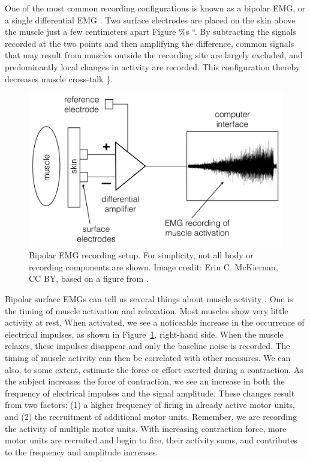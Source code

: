 \documentclass{article}
\begin{document}
One of the most common recording configurations is known as a bipolar EMG, or a single differential EMG \citep{garcia2011surface}. Two surface electrodes are placed on the skin above the muscle just a few centimeters apart \citep{}Figure \%s ``. By subtracting the signals recorded at the two points and then amplifying the difference, common signals that may result from muscles outside the recording site are largely excluded, and predominantly local changes in activity are recorded. This configuration thereby decreases muscle cross-talk \citep{garcia2011surface}\}.

\begin{figure}[!htbp]
\centering
\includegraphics[width=0.8\linewidth]{files/EPpXta8zJdzN048lz8AR-25e73ea3348af927126271020a0558ad.png}
\caption[]{Bipolar EMG recording setup. For simplicity, not all body or recording components are shown. Image credit: Erin C. McKiernan, CC BY, based on a figure from \citet{garcia2011surface}.}
\label{ol35g72GqC}
\end{figure}

Bipolar surface EMGs can tell us several things about muscle activity \citep{garcia2011surface}. One is the timing of muscle activation and relaxation. Most muscles show very little activity at rest. When activated, we see a noticeable increase in the occurrence of electrical impulses, as shown in Figure~\ref{ol35g72GqC}, right-hand side. When the muscle relaxes, these impulses disappear and only the baseline noise is recorded. The timing of muscle activity can then be correlated with other measures. We can also, to some extent, estimate the force or effort exerted during a contraction. As the subject increases the force of contraction, we see an increase in both the frequency of electrical impulses and the signal amplitude. These changes result from two factors: (1) a higher frequency of firing in already active motor units, and (2) the recruitment of additional motor units. Remember, we are recording the activity of multiple motor units. With increasing contraction force, more motor units are recruited and begin to fire, their activity sums, and contributes to the frequency and amplitude increases.
\end{document}
